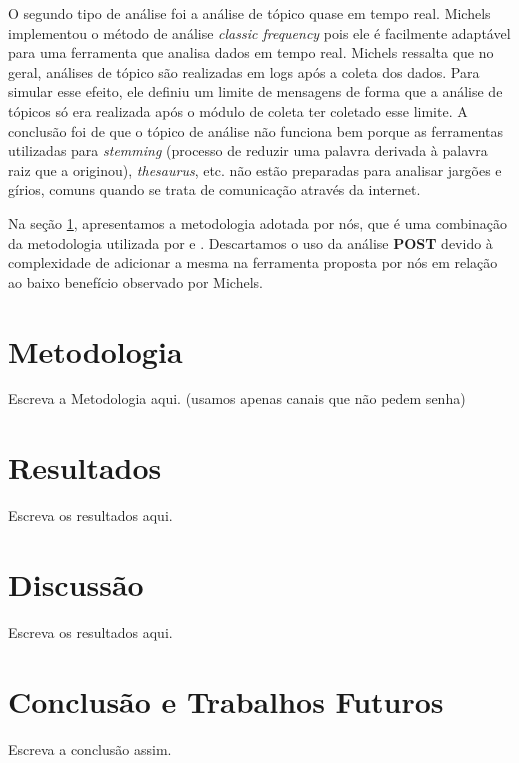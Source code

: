 \documentclass[12pt]{article}
\begin{document}
O segundo tipo de análise foi a análise de tópico quase em tempo real.
Michels implementou o método de análise \textit{classic frequency}
\cite{gainaru2010} pois ele é facilmente adaptável para uma ferramenta que analisa
dados em tempo real.
%
Michels ressalta que no geral, análises de tópico são realizadas em logs
após a coleta dos dados. Para simular esse efeito, ele definiu um limite de
mensagens de forma que a análise de tópicos só era realizada após o módulo de
coleta ter coletado esse limite.
%
A conclusão foi de que o tópico de análise não funciona bem porque as
ferramentas utilizadas para \textit{stemming} (processo de reduzir uma
palavra derivada à palavra raiz que a originou), \textit{thesaurus}, etc.
não estão preparadas para analisar jargões e gírios, comuns quando se trata
de comunicação através da internet.

Na seção \ref{sec:metod}, apresentamos a metodologia adotada por nós, que
é uma combinação da metodologia utilizada por \cite{santos2013} e
\cite{michels2012}.
%
Descartamos o uso da análise \textbf{POST} devido à complexidade de adicionar
a mesma na ferramenta proposta por nós em relação ao baixo benefício observado
por Michels.



\section{Metodologia} \label{sec:metod}

Escreva a Metodologia aqui. (usamos apenas canais que não pedem senha)

\section{Resultados} \label{sec:res}

Escreva os resultados aqui.

\section{Discussão} \label{sec:disc}

Escreva os resultados aqui.


\section{Conclusão e Trabalhos Futuros} \label{sec: concl}

Escreva a conclusão assim.



\end{document}
